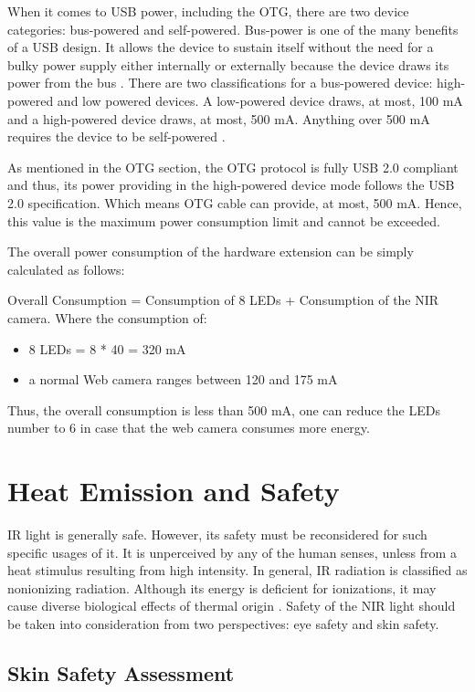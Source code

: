 When it comes to USB power, including the OTG, there are two device categories: bus-powered and self-powered. Bus-power is one of the many benefits of a USB design. It allows the device to sustain itself without the need for a bulky power supply either internally or externally because the device draws its power from the bus \parencite{usb}.
There are two classifications for a bus-powered device: high-powered and low powered devices. A low-powered device draws, at most, 100 mA and a high-powered device draws, at most, 500 mA. Anything over 500 mA requires the device to be self-powered \parencite{usb}.

As mentioned in the OTG section, the OTG protocol is fully USB 2.0 compliant and thus, its power providing in the high-powered device mode follows the USB 2.0 specification. Which means OTG cable can provide, at most, 500 mA. Hence, this value is the maximum power consumption limit and cannot be exceeded.

The overall power consumption of the hardware extension can be simply calculated as follows:	

Overall Consumption = Consumption of 8 LEDs + Consumption of the NIR camera. Where the consumption of:
\begin{itemize}
	  \item 8 LEDs = 8 * 40 = 320 mA
	  \item a normal Web camera ranges between 120 and 175 mA
\end{itemize}
Thus, the overall consumption is less than 500 mA, one can reduce the LEDs number to 6 in case that the web camera consumes more energy.


\section{Heat Emission and Safety}
IR light is generally safe. However, its safety must be reconsidered for such specific usages of it. It is unperceived by any of the human senses, unless from a heat stimulus resulting from high intensity.
In general, IR radiation is classified as nonionizing radiation. Although its energy is deficient for ionizations, it may cause diverse biological effects of thermal origin \parencite{ledEyeSafety}.
Safety of the NIR light should be taken into consideration from two perspectives: eye safety and skin safety.

\subsection {Skin Safety Assessment}

